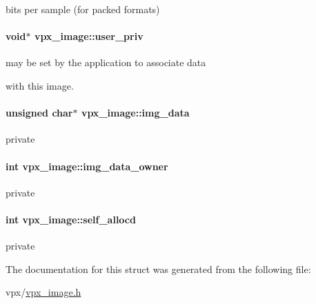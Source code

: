 bits per sample (for packed formats) \hypertarget{structvpx__image_a28ae6c046dfca87de4fca4e67cab563d}{
\paragraph[{user\-\_\-priv}]{\setlength{\rightskip}{0pt plus 5cm}void$\ast$ vpx\-\_\-image\-::user\-\_\-priv}}\label{structvpx__image_a28ae6c046dfca87de4fca4e67cab563d}
\begin{DoxyVerb}    may be set by the application to associate data
\end{DoxyVerb}
 with this image. \hypertarget{structvpx__image_a3c9b7a7a68e4a9665b47433a1e96d78b}{
\paragraph[{img\-\_\-data}]{\setlength{\rightskip}{0pt plus 5cm}unsigned char$\ast$ vpx\-\_\-image\-::img\-\_\-data}}\label{structvpx__image_a3c9b7a7a68e4a9665b47433a1e96d78b}
private \hypertarget{structvpx__image_a4d2c8d41b67f7d3f3114212a8d8afdce}{
\paragraph[{img\-\_\-data\-\_\-owner}]{\setlength{\rightskip}{0pt plus 5cm}int vpx\-\_\-image\-::img\-\_\-data\-\_\-owner}}\label{structvpx__image_a4d2c8d41b67f7d3f3114212a8d8afdce}
private \hypertarget{structvpx__image_a33e8c75d8efc5d4f389e8fc09283a4cc}{
\paragraph[{self\-\_\-allocd}]{\setlength{\rightskip}{0pt plus 5cm}int vpx\-\_\-image\-::self\-\_\-allocd}}\label{structvpx__image_a33e8c75d8efc5d4f389e8fc09283a4cc}
private 

The documentation for this struct was generated from the following file\-:\begin{DoxyCompactItemize}
\item 
vpx/\hyperlink{vpx__image_8h}{vpx\-\_\-image.\-h}\end{DoxyCompactItemize}
